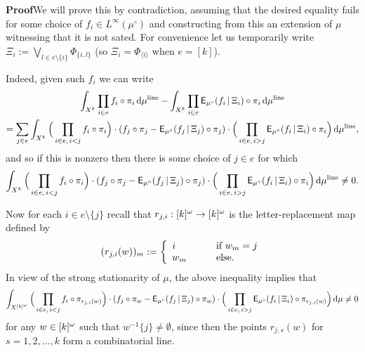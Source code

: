 \documentclass[11pt]{article}
\begin{document}
\textbf{Proof}\quad We will prove this by contradiction, assuming
that the desired equality fails for some choice of $f_i \in
L^\infty(\mu^\circ)$ and constructing from this an extension of
$\mu$ witnessing that it is not sated.  For convenience let us
temporarily write $\Xi_i := \bigvee_{l\in
e\setminus\{i\}}\Phi_{\{i,l\}}$ (so $\Xi_i = \Phi_{\langle
i\rangle}$ when $e = [k]$).

Indeed, given such $f_i$ we can write
\begin{multline*}
\int_{X^k}\prod_{i\in e} f_i\circ\pi_i\,\mathrm{d}\mu^{\mathrm{line}} -
\int_{X^k}\prod_{i\in e} \mathsf{E}_{\mu^\circ}(f_i\,|\,\Xi_i)\circ\pi_i\,\mathrm{d}\mu^{\mathrm{line}}\\
= \sum_{j\in e}\int_{X^k} \Big(\prod_{i \in e,\,i <
j}f_i\circ\pi_i\Big)\cdot(f_j\circ\pi_j -
\mathsf{E}_{\mu^\circ}(f_j\,|\,\Xi_j)\circ\pi_j)\cdot\Big(\prod_{i \in
e,\,i >
j}\mathsf{E}_{\mu^\circ}(f_i\,|\,\Xi_i)\circ\pi_i\Big)\,\mathrm{d}\mu^{\mathrm{line}},
\end{multline*}
and so if this is nonzero then there is some choice of $j\in e$ for
which
\[\int_{X^k} \Big(\prod_{i \in e,\,i <
j}f_i\circ\pi_i\Big)\cdot(f_j\circ\pi_j -
\mathsf{E}_{\mu^\circ}(f_j\,|\,\Xi_j)\circ\pi_j)\cdot\Big(\prod_{i \in
e,\,i >
j}\mathsf{E}_{\mu^\circ}(f_i\,|\,\Xi_i)\circ\pi_i\Big)\,\mathrm{d}\mu^{\mathrm{line}} \neq
0.\]

Now for each $i\in e\setminus \{j\}$ recall that
$r_{j,i}:[k]^{\omega}\to[k]^{\omega}$ is the letter-replacement map defined
by
\[(r_{j,i}(w))_m := \left\{\begin{array}{ll}i&\quad\quad\hbox{if }w_m = j\\ w_m&\quad\quad\hbox{else.}\end{array}\right.\]
In view of the strong stationarity of $\mu$, the above inequality
implies that
\[\int_{X^{[k]^\omega}} \Big(\prod_{i \in e,\,i < j}f_i\circ\pi_{r_{j,i}(w)}\Big)\cdot (f_j\circ\pi_w -
\mathsf{E}_{\mu^\circ}(f_j\,|\,\Xi_j)\circ\pi_w)\cdot \Big(\prod_{i \in
e,\,i
> j}\mathsf{E}_{\mu^\circ}(f_i\,|\,\Xi_i)\circ\pi_{r_{j,i}(w)}\Big)\,\mathrm{d}\mu \neq 0\]
for any $w \in [k]^\omega$ such that $w^{-1}\{j\} \neq \emptyset$, since
then the points $r_{j,s}(w)$ for $s=1,2,\ldots,k$ form a
combinatorial line.
\end{document}
